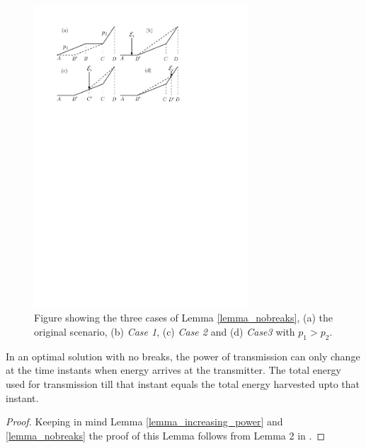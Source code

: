 \begin{figure}[htb]
\centering
\centerline{\includegraphics[width=8cm]{Lemma2.pdf}}
\caption{Figure showing the three cases of Lemma \ref{lemma_nobreaks}, (a) the original scenario, (b) \textit{Case 1}, (c) \textit{Case 2} and (d) \textit{Case3} with $p_1>p_2$.}
\label{Lemma2_figure}
\end{figure}

\begin{lemma}
In an optimal solution with no breaks, the power of transmission can only change at the time instants when energy arrives at the transmitter. The total energy used for transmission till that instant equals the total energy harvested upto that instant.
\label{lemma_energy_consumed} 
\end{lemma}
\begin{proof}
Keeping in mind Lemma \ref{lemma_increasing_power} and \ref{lemma_nobreaks} the proof of this Lemma follows from Lemma 2 in \cite{Yang}. 
\end{proof}	
